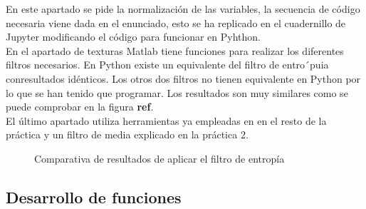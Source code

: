 \documentclass[a4paper,12pt]{report}
\begin{document}
En este apartado se pide la normalización de las variables, la secuencia de código necesaria viene dada en el enunciado, esto se ha replicado en el cuadernillo de Jupyter modificando el código para funcionar en Pyhthon.\\

En el apartado de texturas Matlab tiene funciones para realizar los diferentes filtros necesarios. En Python existe un equivalente del filtro de entro´puia conresultados idénticos. Los otros dos filtros no tienen equivalente en Python por lo que se han tenido que programar. Los resultados son muy similares como se puede comprobar en la figura \textbf{ref}.\\

El último apartado utiliza herramientas ya empleadas en en el resto de la práctica y un filtro de media explicado en la práctica 2.\\

\begin{figure}[!tbp]
  \centering
  \hfill
  \caption{Comparativa de resultados de aplicar el filtro de entropía}
  \label{entropyfilt}
\end{figure}


\subsection{Desarrollo de funciones}
\end{document}
